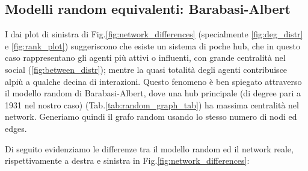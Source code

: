 \documentclass[twocolumn]{article}
\begin{document}
   \subsection{Modelli random equivalenti: Barabasi-Albert}
   I dai plot di sinistra di Fig.\ref{fig:network_differences} (specialmente \ref{fig:deg_distr} e \ref{fig:rank_plot}) suggeriscono che esiste un sistema di poche hub,
   che in questo caso rappresentano gli agenti più attivi o influenti, con grande centralità nel social
   (\ref{fig:between_distr}); mentre la quasi totalità degli agenti contribuisce alpiù a qualche decina di interazioni.
   Questo fenomeno è ben spiegato attraverso il modello random di Barabasi-Albert, dove una hub principale (di degree pari a 1931 nel nostro caso) (Tab.\ref{tab:random_graph_tab})
   ha massima centralità nel network.
   Generiamo quindi il grafo random usando lo stesso numero di nodi ed edges.

   Di seguito evidenziamo le differenze tra il modello random ed il network reale, rispettivamente a 
   destra e sinistra in Fig.\ref{fig:network_differences}:
\end{document}
